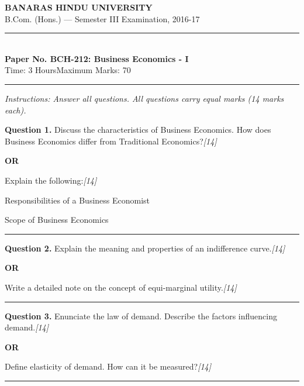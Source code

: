 \documentclass[11pt,a4paper]{article}
\newcommand{\pts}[1]{\hfill   \textit{[#1]}}
\begin{document}
\begin{center}
  {\large\bfseries BANARAS HINDU UNIVERSITY}\\[2pt]
  {\normalsize B.Com. (Hons.) --- Semester III Examination, 2016-17}\\[6pt]
  \rule{0.8\linewidth}{0.5pt}\\[6pt]
  {\large\bfseries Paper No. BCH-212: Business Economics - I}\\[4pt]
  {\normalsize Time: 3 Hours\hfill Maximum Marks: 70}
\end{center}

\rule{\linewidth}{0.4pt}

\smallskip



\noindent   \textit{Instructions: Answer all questions. All questions carry equal marks (14 marks each).}

\bigskip




\noindent   \textbf{Question 1.}
Discuss the characteristics of Business Economics. How does Business Economics differ from Traditional Economics?\pts{14}

\centerline{   \textbf{OR}}

Explain the following:\pts{14}

\begin{parts}
  \item Responsibilities of a Business Economist
  \item Scope of Business Economics
\end{parts}

\medskip\rule{\linewidth}{0.2pt}




\noindent   \textbf{Question 2.}
Explain the meaning and properties of an indifference curve.\pts{14}

\centerline{   \textbf{OR}}

Write a detailed note on the concept of equi-marginal utility.\pts{14}

\medskip\rule{\linewidth}{0.2pt}




\noindent   \textbf{Question 3.}
Enunciate the law of demand. Describe the factors influencing demand.\pts{14}

\centerline{   \textbf{OR}}

Define elasticity of demand. How can it be measured?\pts{14}

\medskip\rule{\linewidth}{0.2pt}
\end{document}
